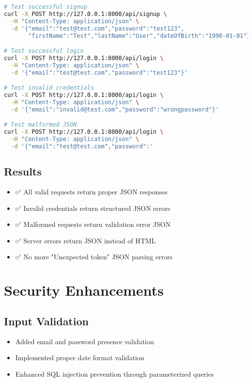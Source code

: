 \documentclass[12pt,a4paper]{article}
\begin{document}
\begin{lstlisting}[language=bash, caption=API Testing Commands]
# Test successful signup
curl -X POST http://127.0.0.1:8000/api/signup \
  -H "Content-Type: application/json" \
  -d '{"email":"test@test.com","password":"test123",
       "firstName":"Test","lastName":"User","dateOfBirth":"1990-01-01"}'

# Test successful login  
curl -X POST http://127.0.0.1:8000/api/login \
  -H "Content-Type: application/json" \
  -d '{"email":"test@test.com","password":"test123"}'

# Test invalid credentials
curl -X POST http://127.0.0.1:8000/api/login \
  -H "Content-Type: application/json" \
  -d '{"email":"invalid@test.com","password":"wrongpassword"}'

# Test malformed JSON
curl -X POST http://127.0.0.1:8000/api/login \
  -H "Content-Type: application/json" \
  -d '{"email":"test@test.com","password":'
\end{lstlisting}

\subsection{Results}
\begin{itemize}
    \item ✅ All valid requests return proper JSON responses
    \item ✅ Invalid credentials return structured JSON errors
    \item ✅ Malformed requests return validation error JSON
    \item ✅ Server errors return JSON instead of HTML
    \item ✅ No more "Unexpected token" JSON parsing errors
\end{itemize}

\section{Security Enhancements}

\subsection{Input Validation}
\begin{itemize}
    \item Added email and password presence validation
    \item Implemented proper date format validation
    \item Enhanced SQL injection prevention through parameterized queries
\end{itemize}
\end{document}
